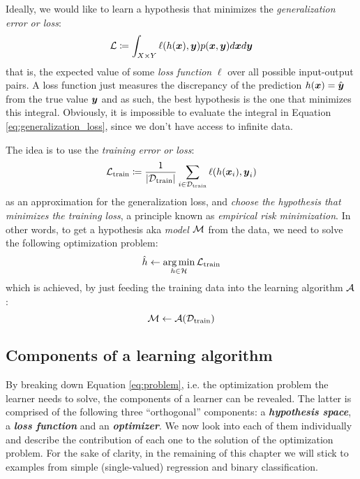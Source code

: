 Ideally, we would like to learn a hypothesis that minimizes the
\emph{generalization error or loss}:
\begin{equation}
	\label{eq:generalization_loss}
	\mathcal{L} \coloneqq \int_{X \times Y} \ell(h(\boldsymbol{x}), \boldsymbol{y}) p(\boldsymbol{x}, \boldsymbol{y}) d\boldsymbol{x} d\boldsymbol{y}
\end{equation}
that is, the expected value of some \emph{loss function}
$\ell$ over all possible input-output pairs. A loss function just measures the
discrepancy of the prediction $h(\boldsymbol{x}) = \hat{\boldsymbol{y}}$ from the true value $\boldsymbol{y}$
and as such, the best hypothesis is the one that minimizes this integral.
Obviously, it is impossible to evaluate the integral in Equation
\ref{eq:generalization_loss}, since we don't have access to infinite data.

The idea is to use the \emph{training error or loss}:
\begin{equation}
	\label{eq:training_loss}
	\mathcal{L}_\text{train} \coloneqq \frac{1}{\lvert \mathcal{D}_\text{train} \rvert} \sum_{i \in \mathcal{D}_\text{train}}
	\ell(h(\boldsymbol{x}_i), \boldsymbol{y}_i)
\end{equation}
as an approximation for the generalization loss, and \emph{choose the hypothesis
that minimizes the training loss}, a principle known as \emph{empirical risk
minimization}. In other words, to get a
hypothesis aka \emph{model} $\mathcal{M}$ from the data, we need to
solve the following optimization problem:
\begin{equation}
	\label{eq:problem}
	\hat{h} \gets \operatorname*{arg\,min}_{h \in \mathcal{H}} \mathcal{L}_\text{train}
\end{equation}
which is achieved, by just feeding the training data into the learning
algorithm $\mathcal{A}$:
\begin{equation}
	\label{eq:learner}
	\mathcal{M} \gets \mathcal{A}(\mathcal{D}_\text{train})
\end{equation}

\subsection{Components of a learning algorithm}

By breaking down Equation \ref{eq:problem}, i.e. the optimization problem the
learner needs to solve, the components of a learner can be revealed. The latter
is comprised of the following three ``orthogonal'' components: a
\emph{\textbf{hypothesis space}}, a \emph{\textbf{loss
function}} and an \emph{\textbf{optimizer}}. We now look into each of them
individually and describe the contribution of each one to the solution of the
optimization problem. For the sake of clarity, in the remaining of this chapter
we will stick to examples from simple (single-valued) regression and binary
classification.

